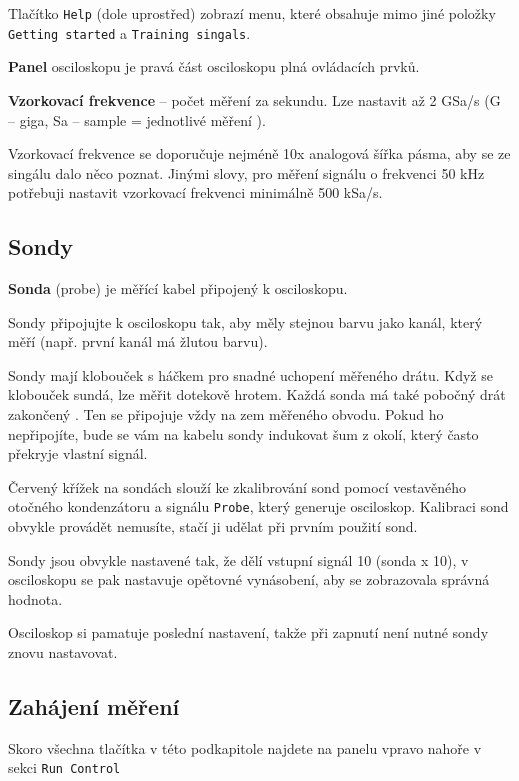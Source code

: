 Tlačítko \texttt{Help} (dole uprostřed) zobrazí menu, které  obsahuje mimo jiné položky \texttt{Getting started} a  \texttt{Training singals}. 

\textbf{Panel} \label{panel} osciloskopu je pravá část osciloskopu plná ovládacích prvků.

\textbf{Vzorkovací frekvence} -- počet měření za sekundu. 
Lze nastavit až 2 GSa/s 
(G -- giga, Sa -- sample = jednotlivé měření ). 

Vzorkovací frekvence se doporučuje nejméně 10x analogová šířka pásma, aby se ze singálu dalo něco poznat. 
Jinými slovy, pro měření signálu o frekvenci 50 kHz potřebuji nastavit vzorkovací frekvenci minimálně 500 kSa/s.

\subsection{Sondy}

\textbf{Sonda} (probe)  je měřící kabel připojený k osciloskopu. 

Sondy připojujte k osciloskopu tak, aby měly stejnou barvu jako kanál, který měří (např. první kanál má žlutou barvu). 

Sondy  mají klobouček s háčkem pro snadné uchopení měřeného drátu. Když se klobouček sundá, lze měřit dotekově hrotem. 
Každá sonda má také pobočný drát zakončený . 
Ten se připojuje vždy na zem měřeného obvodu. 
Pokud ho nepřipojíte, bude se vám na kabelu sondy indukovat šum z okolí, který často překryje vlastní signál. 

Červený křížek na sondách slouží ke zkalibrování sond pomocí vestavěného otočného kondenzátoru a signálu \texttt{Probe}, který generuje osciloskop. 
Kalibraci sond obvykle provádět nemusíte, stačí ji udělat při prvním použití sond. 

Sondy jsou obvykle nastavené tak, že dělí vstupní signál 10 (sonda x 10), v osciloskopu se pak nastavuje opětovné vynásobení, 
aby se zobrazovala správná hodnota. 

Osciloskop si pamatuje poslední nastavení, takže při zapnutí není nutné sondy znovu nastavovat.  


\subsection{Zahájení měření}

Skoro všechna tlačítka v této podkapitole najdete na panelu vpravo nahoře v sekci {\tt Run Control}

